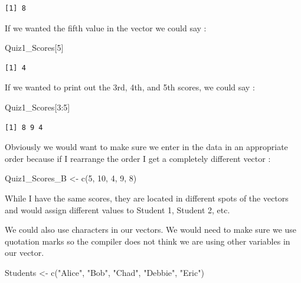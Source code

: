 \documentclass[
  letterpaper,
  DIV=11,
  numbers=noendperiod]{scrreprt}
\newenvironment{Shaded}{\begin{snugshade}}{\end{snugshade}}
\newcommand{\DecValTok}[1]{\textcolor[rgb]{0.68,0.00,0.00}{#1}}
\newcommand{\FunctionTok}[1]{\textcolor[rgb]{0.28,0.35,0.67}{#1}}
\newcommand{\NormalTok}[1]{\textcolor[rgb]{0.00,0.23,0.31}{#1}}
\newcommand{\OtherTok}[1]{\textcolor[rgb]{0.00,0.23,0.31}{#1}}
\newcommand{\SpecialCharTok}[1]{\textcolor[rgb]{0.37,0.37,0.37}{#1}}
\newcommand{\StringTok}[1]{\textcolor[rgb]{0.13,0.47,0.30}{#1}}
\begin{document}
\begin{verbatim}
[1] 8
\end{verbatim}

If we wanted the fifth value in the vector we could say :

\begin{Shaded}
\begin{Highlighting}[]
\NormalTok{Quiz1\_Scores[}\DecValTok{5}\NormalTok{]}
\end{Highlighting}
\end{Shaded}

\begin{verbatim}
[1] 4
\end{verbatim}

If we wanted to print out the 3rd, 4th, and 5th scores, we could say :

\begin{Shaded}
\begin{Highlighting}[]
\NormalTok{Quiz1\_Scores[}\DecValTok{3}\SpecialCharTok{:}\DecValTok{5}\NormalTok{]}
\end{Highlighting}
\end{Shaded}

\begin{verbatim}
[1] 8 9 4
\end{verbatim}

Obviously we would want to make sure we enter in the data in an
appropriate order because if I rearrange the order I get a completely
different vector :

\begin{Shaded}
\begin{Highlighting}[]
\NormalTok{Quiz1\_Scores\_B }\OtherTok{\textless{}{-}} \FunctionTok{c}\NormalTok{(}\DecValTok{5}\NormalTok{, }\DecValTok{10}\NormalTok{, }\DecValTok{4}\NormalTok{, }\DecValTok{9}\NormalTok{, }\DecValTok{8}\NormalTok{)}
\end{Highlighting}
\end{Shaded}

While I have the same scores, they are located in different spots of the
vectors and would assign different values to Student 1, Student 2, etc.

We could also use characters in our vectors. We would need to make sure
we use quotation marks so the compiler does not think we are using other
variables in our vector.

\begin{Shaded}
\begin{Highlighting}[]
\NormalTok{Students }\OtherTok{\textless{}{-}} \FunctionTok{c}\NormalTok{(}\StringTok{"Alice"}\NormalTok{, }\StringTok{"Bob"}\NormalTok{, }\StringTok{"Chad"}\NormalTok{, }\StringTok{"Debbie"}\NormalTok{, }\StringTok{"Eric"}\NormalTok{)}
\end{Highlighting}
\end{Shaded}
\end{document}
